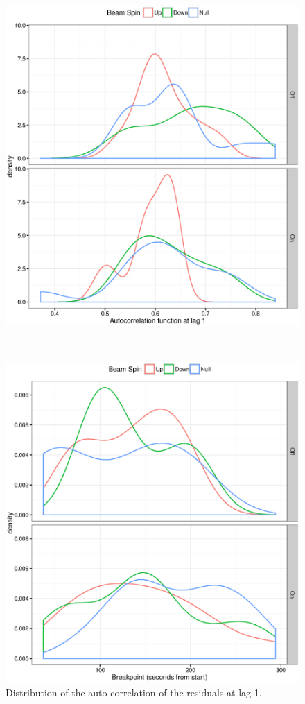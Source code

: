 \documentclass{report}
\begin{document}
\begin{figure}[h]
	\centering
	\begin{minipage}{.5\textwidth}
		\centering
		\includegraphics[scale=.5]{ACF1_dens.eps}
		\caption{Distribution of the auto-correlation of the residuals at lag 1.\label{fig:DW2}}
	\end{minipage}~~
	\begin{minipage}{.5\textwidth}
		\centering
		\includegraphics[scale=.5]{FStats_BP_dens.eps}

\end{minipage}
\end{figure}
\end{document}
